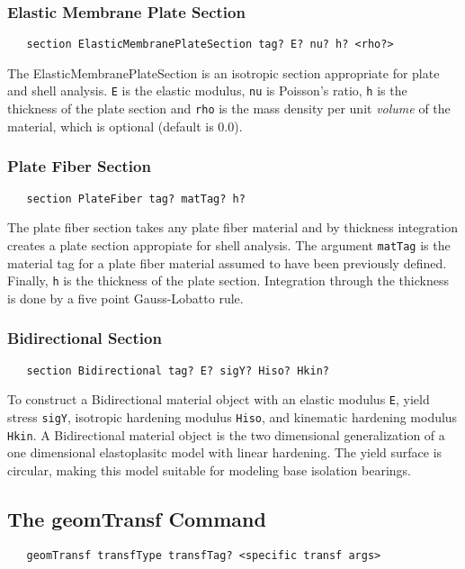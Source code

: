 \documentclass[12pt]{article}
\begin{document}
\subsubsection{Elastic Membrane Plate Section}
{\sf\small
\begin{verbatim}
   section ElasticMembranePlateSection tag? E? nu? h? <rho?>
\end{verbatim}
}
The ElasticMembranePlateSection
is an isotropic section appropriate for plate and shell analysis.
{\tt E} is the elastic modulus, {\tt nu} is Poisson's ratio, 
{\tt h} is the thickness of the plate section and
{\tt rho} is the mass density per unit {\em volume} of the material,
which is optional (default is 0.0).


\subsubsection{Plate Fiber Section}
{\sf\small
\begin{verbatim}
   section PlateFiber tag? matTag? h?
\end{verbatim}
}
The plate fiber section takes any plate fiber material and by 
thickness integration creates a plate section appropiate for shell analysis.
The argument {\tt matTag} is the material tag for a plate
fiber material assumed to have been previously defined. Finally,
{\tt h} is the thickness of the plate section. Integration through the
thickness is done by a five point Gauss-Lobatto rule.

\subsubsection{Bidirectional Section}
{\sf\small
\begin{verbatim}
   section Bidirectional tag? E? sigY? Hiso? Hkin?
\end{verbatim}
}

To construct a Bidirectional material object with an elastic modulus
{\tt E}, yield stress {\tt sigY}, isotropic hardening modulus {\tt Hiso},
and kinematic hardening modulus {\tt Hkin}. A Bidirectional material
object is the two dimensional generalization of a one dimensional
elastoplasitc model with linear hardening. The yield surface is circular,
making this model suitable for modeling base isolation bearings.

\subsection{The geomTransf Command}
{\sf\small
\begin{verbatim}
   geomTransf transfType transfTag? <specific transf args>
\end{verbatim}
}
\end{document}
